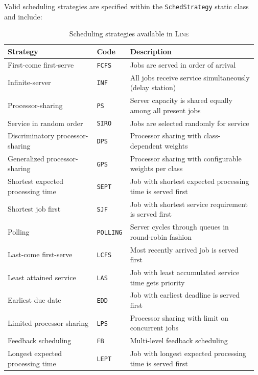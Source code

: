 Valid scheduling strategies are specified within the \texttt{SchedStrategy} static class and include:
\begin{table}[ht!]
\renewcommand{\arraystretch}{1.2}
\centering
\caption{Scheduling strategies available in \textsc{Line}}
{\small
\begin{tabular}{|p{0.35\linewidth}|p{0.12\linewidth}|p{0.5\linewidth}|}
\hline
\textbf{Strategy} & \textbf{Code} & \textbf{Description} \\
\hline
First-come first-serve & \texttt{FCFS} & Jobs are served in order of arrival \\
\hline
Infinite-server\index{INF (Infinite Server)|see{Network models}} & \texttt{INF} & All jobs receive service simultaneously (delay station) \\
\hline
Processor-sharing & \texttt{PS} & Server capacity is shared equally among all present jobs \\
\hline
Service in random order & \texttt{SIRO} & Jobs are selected randomly for service \\
\hline
Discriminatory processor-sharing & \texttt{DPS} & Processor sharing with class-dependent weights \\
\hline
Generalized processor-sharing & \texttt{GPS} & Processor sharing with configurable weights per class \\
\hline
Shortest expected processing time & \texttt{SEPT} & Job with shortest expected processing time is served first \\
\hline
Shortest job first\index{SJF (Shortest Job First)|see{Network models}} & \texttt{SJF} & Job with shortest service requirement is served first \\
\hline
Polling & \texttt{POLLING} & Server cycles through queues in round-robin fashion \\
\hline
Last-come first-serve & \texttt{LCFS} & Most recently arrived job is served first \\
\hline
Least attained service\index{LAS (Least Attained Service)|see{Network models}} & \texttt{LAS} & Job with least accumulated service time gets priority \\
\hline
Earliest due date\index{EDD (Earliest Due Date)|see{Network models}} & \texttt{EDD} & Job with earliest deadline is served first \\
\hline
Limited processor sharing & \texttt{LPS} & Processor sharing with limit on concurrent jobs \\
\hline
Feedback scheduling & \texttt{FB} & Multi-level feedback scheduling \\
\hline
Longest expected processing time & \texttt{LEPT} & Job with longest expected processing time is served first \\
\hline
\end{tabular}}
\label{TAB_sched_strategies}
\end{table}
